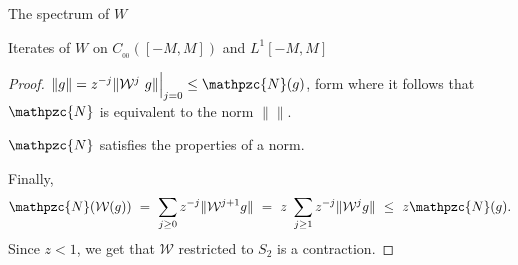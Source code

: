 \documentclass[12pt]{article}
\begin{document}
\begin{section}{The spectrum of $W$ }
\begin{subsection}{Iterates of $W$ on $C_{_{0\!0}}([-M,M])$ and $L^1[-M,M]$ }
\begin{proof}
$\| g \| = z^{-j} \| \mathcal{W}^j \ g\| \Big|_{j=0} \le \mathpzc{N}(g)$, form where it follows that $\mathpzc{N}$ is equivalent to the norm $\| \|$.  

$\mathpzc{N}$ satisfies the properties of a norm.   

Finally,
$$
\mathpzc{N}(\mathcal{W}(g)) 
~=~ \sum_{j \ge 0} z^{-j} \| \mathcal{W}^{j+1} g\|
~=~ z \ \sum_{j \ge 1} z^{-j} \| \mathcal{W}^{j} g\|
~\le~ z \mathpzc{N}(g).
$$
Since $ z < 1$, we get that $\mathcal{W}$ restricted to $S_2$ is a contraction.  
\end{proof}
	
	
\end{subsection}


		
\end{section}

\end{document}
